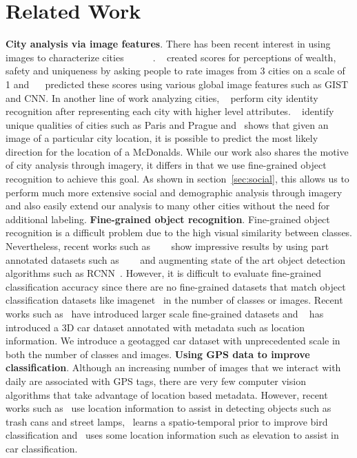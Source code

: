 \documentclass[10pt,twocolumn,letterpaper]{article}
\begin{document}
\section{Related Work}
\textbf{City analysis via image features}. There has been recent interest in using images to characterize cities~\cite{mit_plos_1}~\cite{tamara}~\cite{paris}~\cite{antonio}~\cite{mit_cvpr}~\cite{mcdonalds}. ~\cite{mit_plos_1} created scores for perceptions of wealth, safety and uniqueness by asking people to rate images from 3 cities on a scale of 1 and ~\cite{mit_cvpr}~\cite{tamara} predicted these scores using various global image features such as GIST and CNN. In another line of work analyzing cities, ~\cite{antonio} perform city identity recognition after representing each city with higher level attributes. ~\cite{paris} identify unique qualities of cities such as Paris and Prague and~\cite{mcdonalds} shows that given an image of a particular city location, it is possible to predict the most likely direction for the location of a McDonalds. While our work also shares the motive of city analysis through imagery, it differs in that we use fine-grained object recognition to achieve this goal. As shown in section~\ref{sec:social}, this allows us to perform much more extensive social and demographic analysis through imagery and also easily extend our analysis to many other cities without the need for additional labeling.\newline\newline
\textbf{Fine-grained object recognition}. Fine-grained object recognition is a difficult problem due to the high visual similarity between classes. Nevertheless, recent works such as ~\cite{ning}~\cite{steve}~\cite{jon} show impressive results by using part annotated datasets such as ~\cite{birds}~\cite{dogs}~\cite{cars} and augmenting state of the art object detection algorithms such as RCNN~\cite{rcnn}. However, it is difficult to evaluate fine-grained classification accuracy since there are no fine-grained datasets that match object classification datasets like imagenet~\cite{imagenet} in the number of classes or images. Recent works such as~\cite{birdsnap} have introduced larger scale fine-grained datasets and ~\cite{nyc3d} has introduced a 3D car dataset annotated with metadata such as location information. We introduce a geotagged car dataset with unprecedented scale in both the number of classes and images.\newline\newline
\textbf{Using GPS data to improve classification}. Although an increasing number of images that we interact with daily are associated with GPS tags, there are very few computer vision algorithms that take advantage of location based metadata. However, recent works such as~\cite{amir} use location information to assist in detecting objects such as trash cans and street lamps,~\cite{birdsnap} learns a spatio-temporal prior to improve bird classification and~\cite{nyc3d} uses some location information such as elevation to assist in car classification. 
\end{document}
